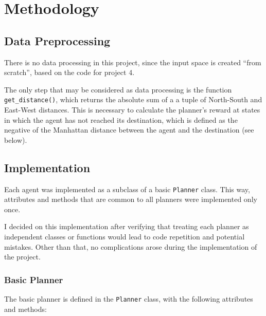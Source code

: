 \documentclass{article}
\begin{document}
\section{Methodology}

\subsection{Data Preprocessing}
There is no data processing in this project, since the input space is created ``from scratch'', based on the code for project 4.

The only step that may be considered as data processing is the function \texttt{get\_distance()}, which returns the absolute sum of a a tuple of North-South and East-West distances. This is necessary to calculate the planner's reward at states in which the agent has not reached its destination, which is defined as the negative of the Manhattan distance between the agent and the destination (see below).

\subsection{Implementation}
\label{sec:implementation}

Each agent was implemented as a subclass of a basic \texttt{Planner} class. This way, attributes and methods that are common to all planners were implemented only once.

I decided on this implementation after verifying that treating each planner as independent classes or functions would lead to code repetition and potential mistakes. Other than that, no complications arose during the implementation of the project.

\subsubsection{Basic Planner}
\label{subsec:basic}

The basic planner is defined in the \texttt{Planner} class, with the following attributes and methods:
\end{document}
